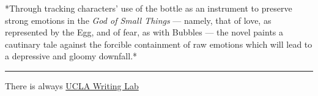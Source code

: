 \documentclass[letterpaper]{article}
\begin{document}
*Through tracking characters' use of the bottle as an instrument to
preserve strong emotions in the \emph{God of Small Things} --- namely, that
of love, as represented by the Egg, and of fear, as with Bubbles --- the
novel paints a cautinary tale against the forcible containment of raw
emotions which will lead to a depressive and gloomy downfall.*

\noindent\rule{\textwidth}{0.5pt}

There is always
\href{https://wp.ucla.edu/wp-content/uploads/2016/01/UWC\_handouts\_What-How-So-What-Thesis-revised-5-4-15-RZ.pdf}{UCLA
Writing Lab}
\end{document}
